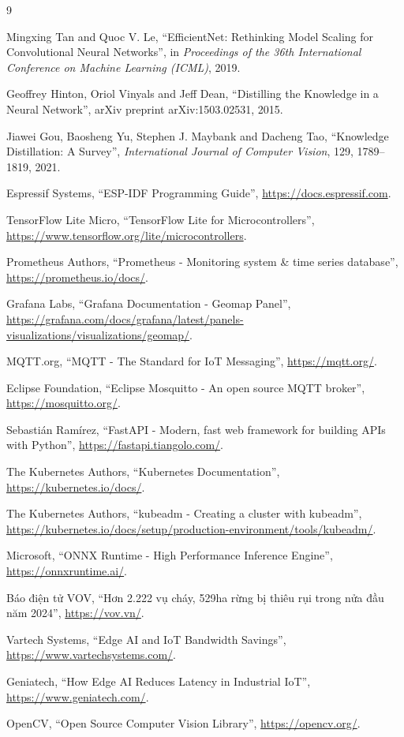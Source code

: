 \documentclass[12pt,a4paper]{report}
\begin{document}
\begin{thebibliography}{9}

Mingxing Tan and Quoc V. Le,
``EfficientNet: Rethinking Model Scaling for Convolutional Neural Networks'',
in \emph{Proceedings of the 36th International Conference on Machine Learning (ICML)}, 2019.

Geoffrey Hinton, Oriol Vinyals and Jeff Dean,
``Distilling the Knowledge in a Neural Network'',
arXiv preprint arXiv:1503.02531, 2015.

Jiawei Gou, Baosheng Yu, Stephen J. Maybank and Dacheng Tao,
``Knowledge Distillation: A Survey'',
\emph{International Journal of Computer Vision}, 129, 1789--1819, 2021.

Espressif Systems,
``ESP-IDF Programming Guide'',
\url{https://docs.espressif.com}.

TensorFlow Lite Micro,
``TensorFlow Lite for Microcontrollers'',
\url{https://www.tensorflow.org/lite/microcontrollers}.

Prometheus Authors,
``Prometheus - Monitoring system \& time series database'',
\url{https://prometheus.io/docs/}.

Grafana Labs,
``Grafana Documentation - Geomap Panel'',
\url{https://grafana.com/docs/grafana/latest/panels-visualizations/visualizations/geomap/}.

MQTT.org,
``MQTT - The Standard for IoT Messaging'',
\url{https://mqtt.org/}.

Eclipse Foundation,
``Eclipse Mosquitto - An open source MQTT broker'',
\url{https://mosquitto.org/}.

Sebastián Ramírez,
``FastAPI - Modern, fast web framework for building APIs with Python'',
\url{https://fastapi.tiangolo.com/}.

The Kubernetes Authors,
``Kubernetes Documentation'',
\url{https://kubernetes.io/docs/}.

The Kubernetes Authors,
``kubeadm - Creating a cluster with kubeadm'',
\url{https://kubernetes.io/docs/setup/production-environment/tools/kubeadm/}.

Microsoft,
``ONNX Runtime - High Performance Inference Engine'',
\url{https://onnxruntime.ai/}.

Báo điện tử VOV,
``Hơn 2.222 vụ cháy, 529ha rừng bị thiêu rụi trong nửa đầu năm 2024'',
\url{https://vov.vn/}.

Vartech Systems,
``Edge AI and IoT Bandwidth Savings'',
\url{https://www.vartechsystems.com/}.

Geniatech,
``How Edge AI Reduces Latency in Industrial IoT'',
\url{https://www.geniatech.com/}.

OpenCV,
``Open Source Computer Vision Library'',
\url{https://opencv.org/}.

\end{thebibliography}
\end{document}

